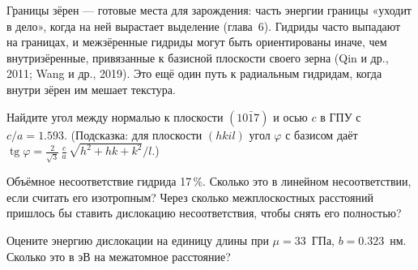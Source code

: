 \begin{zrbox}
Границы зёрен --- готовые места для зарождения: часть энергии границы «уходит в дело», когда на ней вырастает
выделение (глава~6). Гидриды часто выпадают на границах, и межзёренные гидриды могут быть ориентированы иначе, чем
внутризёренные, привязанные к базисной плоскости своего зерна (Qin и др., 2011; Wang и др., 2019). Это ещё один
путь к радиальным гидридам, когда внутри зёрен им мешает текстура.
\end{zrbox}

\begin{exercise}
Найдите угол между нормалью к плоскости $(10\bar17)$ и осью $c$ в ГПУ с $c/a = 1.593$. (Подсказка: для плоскости
$(hkil)$ угол $\varphi$ с базисом даёт $\operatorname{tg}\varphi = \tfrac{2}{\sqrt3}\,\tfrac{c}{a}\,\sqrt{h^2+hk+k^2}/l$.)
\end{exercise}

\begin{exercise}
Объёмное несоответствие гидрида 17\,\%. Сколько это в линейном несоответствии, если считать его изотропным? Через
сколько межплоскостных расстояний пришлось бы ставить дислокацию несоответствия, чтобы снять его полностью?
\end{exercise}

\begin{exercise}
Оцените энергию дислокации на единицу длины при $\mu = 33$~ГПа, $b = 0.323$~нм. Сколько это в эВ на межатомное
расстояние?
\end{exercise}
